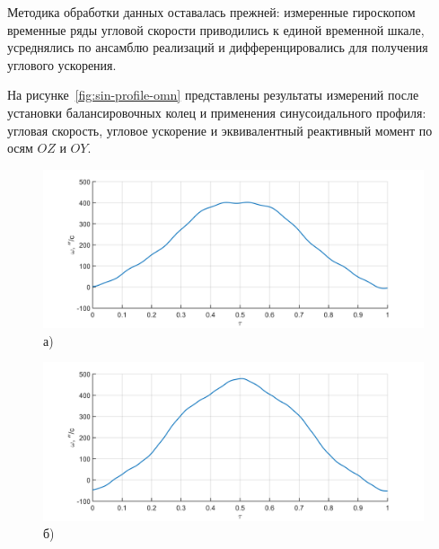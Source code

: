 Методика обработки данных оставалась прежней: измеренные гироскопом временные ряды угловой скорости приводились к единой временной шкале, усреднялись по ансамблю реализаций и дифференцировались для получения углового ускорения.

На рисунке~\cref{fig:sin-profile-omn} представлены результаты измерений после установки балансировочных колец и применения синусоидального профиля: угловая скорость, угловое ускорение и эквивалентный реактивный момент по осям $OZ$ и $OY$.

\begin{figure}[h!]
	\begin{minipage}[b]{0.49\linewidth}\centering
		\includegraphics[width=\linewidth]{matlab/img/oz-gyro-sin-vel} \\ а)
	\end{minipage}
	\hfill
	\begin{minipage}[b]{0.49\linewidth}\centering
		\includegraphics[width=\linewidth]{matlab/img/oy-gyro-sin-vel} \\ б)
	\end{minipage}
	
	\vspace{0.5em} %
	

\end{figure}
